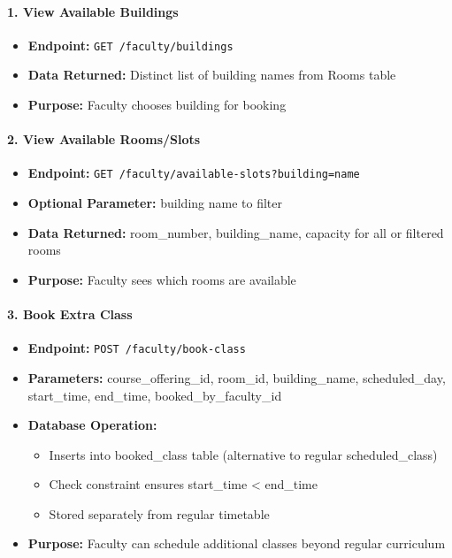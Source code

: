 \documentclass[12pt]{article}
\begin{document}
\paragraph{1. View Available Buildings}
\begin{itemize}
    \item \textbf{Endpoint:} \texttt{GET /faculty/buildings}
    \item \textbf{Data Returned:} Distinct list of building names from Rooms table
    \item \textbf{Purpose:} Faculty chooses building for booking
\end{itemize}

\paragraph{2. View Available Rooms/Slots}
\begin{itemize}
    \item \textbf{Endpoint:} \texttt{GET /faculty/available-slots?building=name}
    \item \textbf{Optional Parameter:} building name to filter
    \item \textbf{Data Returned:} room\_number, building\_name, capacity for all or filtered rooms
    \item \textbf{Purpose:} Faculty sees which rooms are available
\end{itemize}

\paragraph{3. Book Extra Class}
\begin{itemize}
    \item \textbf{Endpoint:} \texttt{POST /faculty/book-class}
    \item \textbf{Parameters:} course\_offering\_id, room\_id, building\_name, scheduled\_day, start\_time, end\_time, booked\_by\_faculty\_id
    \item \textbf{Database Operation:}
        \begin{itemize}
            \item Inserts into booked\_class table (alternative to regular scheduled\_class)
            \item Check constraint ensures start\_time < end\_time
            \item Stored separately from regular timetable
        \end{itemize}
    \item \textbf{Purpose:} Faculty can schedule additional classes beyond regular curriculum
\end{itemize}
\end{document}
